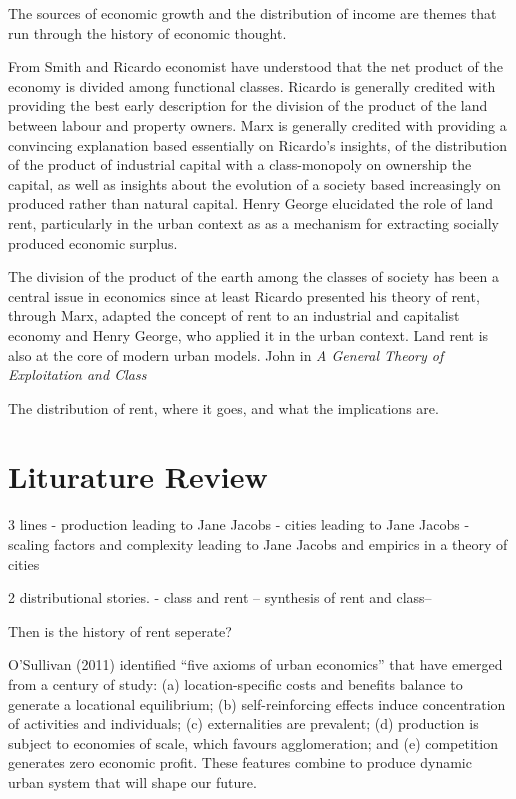 The sources of economic growth and the distribution of income are themes that run through the history of economic thought. 

From Smith and Ricardo economist have understood that the net product of the economy is divided among functional classes.
 Ricardo is generally credited with providing the best early description for the division of the product of the land between labour and property owners. 
 Marx is generally credited with providing a convincing explanation based essentially on Ricardo's insights, of the distribution of the product of industrial capital with a class-monopoly on ownership the capital,  as well as insights about the evolution of a society based increasingly on produced rather than natural capital. 
 Henry George elucidated the role of land rent, particularly in the urban context as as a mechanism for extracting socially produced economic surplus.  

The division of the product of the earth among the classes of society has been a central issue in economics since at least Ricardo presented his theory of  rent, through Marx, adapted the concept of rent to an industrial and capitalist economy and Henry George, who applied it in the urban context. Land rent is also at the core of modern urban models.  John %
in \textit{A General Theory of Exploitation and Class} 


The distribution of rent, where it goes, and what the implications are. 

\section{Liturature Review}

3 lines  
- production leading to Jane Jacobs
- cities leading to Jane Jacobs
- scaling factors and complexity leading to Jane Jacobs and empirics in a theory of cities

2 distributional stories.
- class and rent -- synthesis of rent and class--

Then is the history of rent seperate?

O’Sullivan (2011) identified “five axioms of urban economics” that have emerged from a century of study: (a) location-specific costs and benefits balance to generate a locational equilibrium; (b) self-reinforcing effects induce concentration of activities and individuals; (c) externalities are prevalent; (d) production is subject to economies of scale, which favours agglomeration; and (e) competition generates zero economic profit. These features combine to produce dynamic urban system that will shape our future. 

